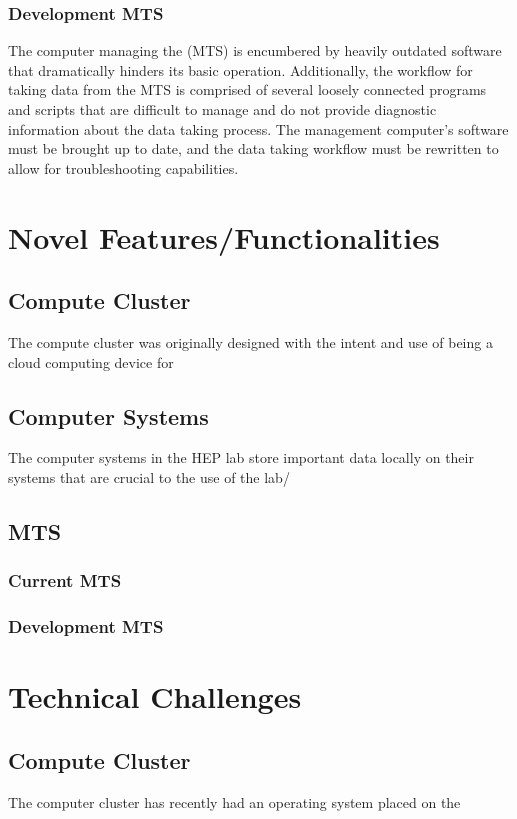 \documentclass[12pt]{article}
\newcommand\tab[1][1cm]{\hspace*{#1}}
\begin{document}
\subsubsection{Development MTS}
\tab The computer managing the (MTS) is encumbered by heavily outdated software that dramatically hinders its basic operation. Additionally, the workflow for taking data from the MTS is
comprised of several loosely connected programs and scripts that
are difficult to manage and do not provide diagnostic information
about the data taking process. The management computer’s software must be brought up to date, and the data taking workflow must be rewritten to allow for troubleshooting capabilities.


\section{Novel Features/Functionalities}
\subsection{Compute Cluster}
\tab The compute cluster was originally designed with the intent and use of being a cloud computing device for 
\subsection{Computer Systems}
\tab The computer systems in the HEP lab store important data locally on their systems that are crucial to the use of the lab/
\subsection{MTS}
\subsubsection{Current MTS}
\subsubsection{Development MTS}



\section{Technical Challenges}
\subsection{Compute Cluster}
\tab The computer cluster has recently had an operating system placed on the 
\end{document}
